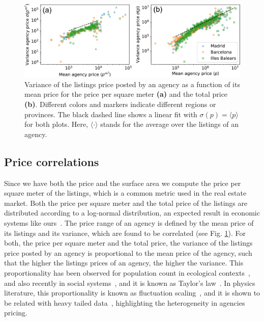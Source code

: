 \begin{figure}
    \centering
    \includegraphics[width =\textwidth]{Figs/Idealista_dynamics/labeled_sigma_price.pdf}
	\caption[Variance of the agency price vs mean agency price.]{Variance of the listings price posted by an agency as a function of its mean price for the price per square meter \textbf{(a)} and the total price \textbf{(b)}. Different colors and markers indicate different regions or provinces. The black dashed line shows a linear fit with $\sigma(p) = \langle p \rangle$ for both plots. Here, $\langle \cdot \rangle$ stands for the average over the listings of an agency. \label{fig:sigma_price}}
\end{figure}

\subsection{Price correlations}

Since we have both the price and the surface area we compute the price per square meter of the listings, which is a common metric used in the real estate market. Both the price per square meter and the total price of the listings are distributed according to a log-normal distribution, an expected result in economic systems like ours~\cite{ibragimov2015heavy}. The price range of an agency is defined by the mean price of its listings and its variance, which are found to be correlated (see Fig. \ref{fig:sigma_price}). For both, the price per square meter and the total price, the variance of the listings price posted by an agency is proportional to the mean price of the agency, such that the higher the listings prices of an agency, the higher the variance. This proportionality has been observed for population count in ecological contexts~\cite{anderson1982variability, kilpatrick2003species}, and also recently in social systems~\cite{chen2020scaling}, and it is known as Taylor's law~\cite{taylor1961aggregation,eisler2008fluctuation}. In physics literature, this proportionality is known as fluctuation scaling~\cite{eisler2008fluctuation}, and it is shown to be related with heavy tailed data~\cite{brown2021taylor}, highlighting the heterogeneity in agencies pricing.

